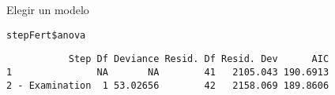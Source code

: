 \documentclass[xcolor={usenames,svgnames,dvipsnames}]{beamer}
\begin{document}
\begin{frame}[fragile,label={sec:org5a00cff}]{Elegir un modelo}
 \lstset{language=r,label= ,caption= ,captionpos=b,numbers=none}
\begin{lstlisting}
stepFert$anova
\end{lstlisting}

\begin{verbatim}
           Step Df Deviance Resid. Df Resid. Dev      AIC
1               NA       NA        41   2105.043 190.6913
2 - Examination  1 53.02656        42   2158.069 189.8606
\end{verbatim}
\end{frame}
\end{document}

